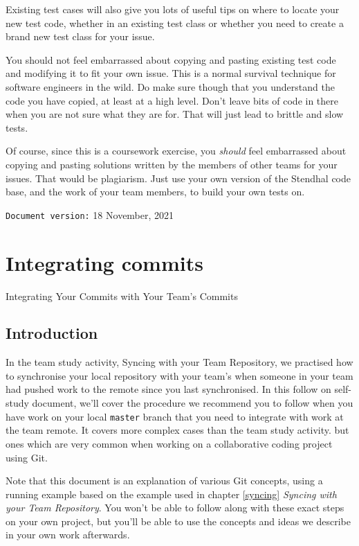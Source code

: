 \documentclass[
]{book}
\begin{document}
Existing test cases will also give you lots of useful tips on where to locate your new test code, whether in an existing test class or whether you need to create a brand new test class for your issue.

You should not feel embarrassed about copying and pasting existing test code and modifying it to fit your own issue. This is a normal survival technique for software engineers in the wild. Do make sure though that you understand the code you have copied, at least at a high level. Don't leave bits of code in there when you are not sure what they are for. That will just lead to brittle and slow tests.

Of course, since this is a coursework exercise, you \emph{should} feel embarrassed about copying and pasting solutions written by the members of other teams for your issues. That would be plagiarism. Just use your own version of the Stendhal code base, and the work of your team members, to build your own tests on.

\texttt{Document\ version:} 18 November, 2021

\hypertarget{committing}{%
\chapter{Integrating commits}\label{committing}}

Integrating Your Commits with Your Team's Commits

\hypertarget{commintro}{%
\section{Introduction}\label{commintro}}

In the team study activity, Syncing with your Team Repository, we practised how to synchronise your local repository with your team's when someone in your team had pushed work to the remote since you last synchronised. In this follow on self-study document, we'll cover the procedure we recommend you to follow when you have work on your local \texttt{master} branch that you need to integrate with work at the team remote. It covers more complex cases than the team study activity. but ones which are very common when working on a collaborative coding project using Git.

Note that this document is an explanation of various Git concepts, using a running example based on the example used in chapter \ref{syncing} \emph{Syncing with your Team Repository}. You won't be able to follow along with these exact steps on your own project, but you'll be able to use the concepts and ideas we describe in your own work afterwards.
\end{document}
